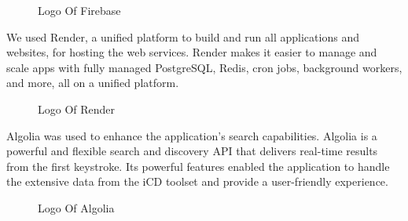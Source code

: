 \vspace{2cm}

\begin{figure}[H]
    \centering
    \caption{  Logo Of Firebase }
    \label{fig: Firebase_Logo}
\end{figure}

We used {\color{purple}Render}, a unified platform to build and run all applications and websites, for hosting the web services. Render makes it easier to manage and scale apps with fully managed PostgreSQL, Redis, cron jobs, background workers, and more, all on a unified platform.

\begin{figure}[H]
    \centering
    \caption{  Logo Of Render }
    \label{fig: Render_Logo}
\end{figure}


\newpage
{\color{purple}Algolia} was used to enhance the application's search capabilities. Algolia is a powerful and flexible search and discovery API that delivers real-time results from the first keystroke. Its powerful features enabled the application to handle the extensive data from the iCD toolset and provide a user-friendly experience.

\begin{figure}[H]
    \centering
    \caption{  Logo Of Algolia }
    \label{fig: Algolia_Logo}
\end{figure}


